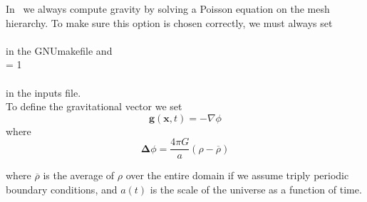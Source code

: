 \label{chap:Gravity}

In \nyx\ we always compute gravity by solving a Poisson equation on the mesh hierarchy.
To make sure this option is chosen correctly, we must always set \\

 \\

\noindent in the GNUmakefile and \\

 = 1  \\
 \\

\noindent in the inputs file.  \\

To define the gravitational vector we set
\begin{equation}
\mathbf{g}(\mathbf{x},t) = -\nabla \phi 
\end{equation}
where 
\begin{equation}
\mathbf{\Delta} \phi = \frac{4 \pi G}{a} (\rho - \overline{\rho}) \label{eq:Self Gravity}
\end{equation}

\noindent where $\overline{\rho}$ is the average of $\rho$ over the entire domain if we assume triply periodic boundary conditions,
and $a(t)$ is the scale of the universe as a function of time.

